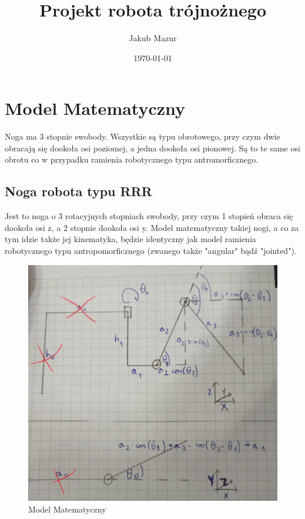 \documentclass[a4paper,13pt]{article}
\title{Projekt robota trójnożnego}
\author{Jakub Mazur}
\date{\today}
\begin{document}


\maketitle

\hypersetup{
	linktocpage=true,
    colorlinks=true,
    urlcolor=red,
    linktoc=all,
    linkcolor=blue,
}
\tableofcontents

\section{Model Matematyczny}
Noga ma 3 stopnie swobody. Wszystkie są typu obrotowego, przy czym dwie obracają się dookoła osi poziomej, a jedna dookoła osi pionowej. Są to te same osi obrotu co w przypadku ramienia robotycznego typu antromorficznego.
\subsection{Noga robota typu RRR}
Jest to noga o 3 rotacyjnych stopniach swobody, przy czym 1 stopień obraca się dookoła osi z, a 2 stopnie dookoła osi y. Model matematyczny takiej nogi, a co za tym idzie także jej kinematyka, będzie identyczny jak model ramienia robotycznego typu antropomorficznego (zwanego także "angular" bądź "jointed").

\begin{figure}[H]
\includegraphics[width=\textwidth]{img/math_model.jpg}
\caption{Model Matematyczny}
\label{math_model}
\end{figure}
\end{document}
